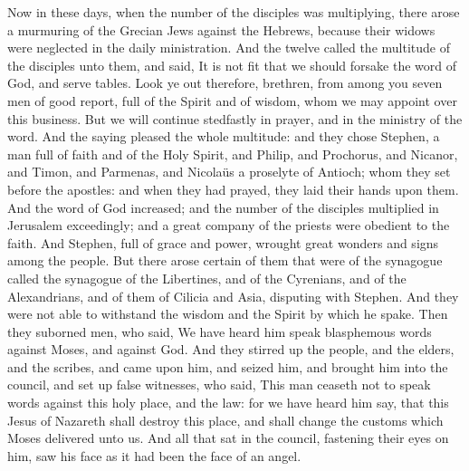 Now in these days, when the number of the disciples was multiplying, there arose a murmuring of the Grecian Jews against the Hebrews, because their widows were neglected in the daily ministration. And the twelve called the multitude of the disciples unto them, and said, It is not fit that we should forsake the word of God, and serve tables. Look ye out therefore, brethren, from among you seven men of good report, full of the Spirit and of wisdom, whom we may appoint over this business. But we will continue stedfastly in prayer, and in the ministry of the word. And the saying pleased the whole multitude: and they chose Stephen, a man full of faith and of the Holy Spirit, and Philip, and Prochorus, and Nicanor, and Timon, and Parmenas, and Nicolaüs a proselyte of Antioch; whom they set before the apostles: and when they had prayed, they laid their hands upon them.  And the word of God increased; and the number of the disciples multiplied in Jerusalem exceedingly; and a great company of the priests were obedient to the faith.  And Stephen, full of grace and power, wrought great wonders and signs among the people. But there arose certain of them that were of the synagogue called the synagogue of the Libertines, and of the Cyrenians, and of the Alexandrians, and of them of Cilicia and Asia, disputing with Stephen. And they were not able to withstand the wisdom and the Spirit by which he spake. Then they suborned men, who said, We have heard him speak blasphemous words against Moses, and against God. And they stirred up the people, and the elders, and the scribes, and came upon him, and seized him, and brought him into the council, and set up false witnesses, who said, This man ceaseth not to speak words against this holy place, and the law: for we have heard him say, that this Jesus of Nazareth shall destroy this place, and shall change the customs which Moses delivered unto us. And all that sat in the council, fastening their eyes on him, saw his face as it had been the face of an angel. 

